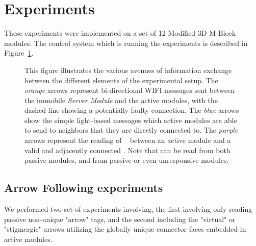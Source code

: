 \section{Experiments}
\label{sec:Experiments}

These experiments were implemented on a set of 12 Modified 3D M-Block modules. The control system which is running the experiments is described in Figure~\ref{fig:electroncsChart}.

\begin{figure}[ht]

	
	
\caption{This figure illustrates the various avenues of information exchange between the different elements of the experimental setup. The \emph{orange} arrows represent bi-directional WIFI messages sent between the immobile \emph{Server Module} and the active modules, with the dashed line showing a potentially faulty connection. The \emph{blue} arrows show the simple light-based messages which active modules are able to send to neighbors that they are directly connected to. The \emph{purple} arrows represent the reading of \tagNamePlural~ between an active module and a valid and adjacently connected \tagName. Note that \tagNamePlural can be read from both passive modules, and from passive or even unresponsive modules.}
	
	\label{fig:electroncsChart}
\end{figure}



\subsection{Arrow Following experiments}
\label{sec:mblocksExperimentsArrow}
We performed two set of experiments involving, the first involving only reading passive non-unique "arrow" tags, and the second including the
"virtual" or "stigmergic" arrows utilizing the globally unique connector faces embedded in active modules.

